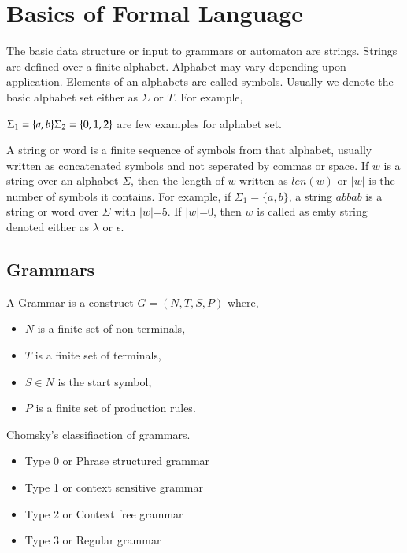  \label{chap:prelim}
 
\section{Basics of Formal Language}

The basic data structure or input to grammars or automaton are strings. Strings are defined over a finite alphabet.
Alphabet may vary depending upon application. Elements of an alphabets are called symbols. Usually we denote the basic alphabet set either as $\Sigma$
or $T$. For example,

$\Sigma_1=\{a,b\}\\\Sigma_2=\{0,1,2\}$ are few examples for alphabet set.

A string or word is a finite sequence of symbols from that alphabet, usually written as concatenated symbols and not seperated by commas or space.
If $w$ is a string over an alphabet $\Sigma$, then the length of $w$ written as $len(w)$ or $|w|$ is the number of symbols it contains. For example,
if $\Sigma_1=\{a,b\}$, a string $abbab$ is a string or word over $\Sigma$ with $|w|$=5. If $|w|$=0, then $w$ is called as emty string denoted either as 
$\lambda$ or $\epsilon$.
 

\subsection{Grammars}
\begin{definition}
A Grammar is a construct
      $G=(N,T,S,P)$ where,
   \begin{itemize}%
  \item $N$ is a finite set of non terminals,
  \item $T$ is a finite set of terminals,
  \item $S \in N$ is the start symbol,
  \item $P$ is a finite set of production rules.
  \end{itemize}
\end{definition}
Chomsky's classifiaction of grammars.
\begin{itemize}%
  \item Type 0 or Phrase structured grammar
  \item Type 1 or context sensitive grammar
  \item Type 2 or Context free grammar
  \item Type 3 or Regular grammar
  \end{itemize}

